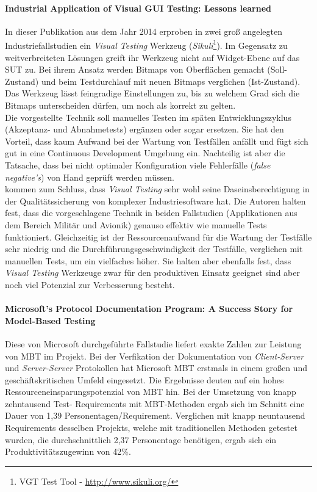 \paragraph{Industrial Application of Visual GUI Testing: Lessons learned \cite{alegroth_industrial_2014}}In dieser Publikation aus dem Jahr 2014 erproben \citeauthor{alegroth_industrial_2014} in zwei groß angelegten Industriefallstudien ein \textit{Visual Testing} Werkzeug (\textit{Sikuli}\footnote{VGT Test Tool - \url{http://www.sikuli.org/}}). Im Gegensatz zu weitverbreiteten Lösungen greift ihr Werkzeug nicht auf Widget-Ebene auf das \Gls{SUT} zu. Bei ihrem Ansatz werden Bitmaps von Oberflächen gemacht (Soll-Zustand) und beim Testdurchlauf mit neuen Bitmaps verglichen (Ist-Zustand). Das Werkzeug lässt feingradige Einstellungen zu, bis zu welchem Grad sich die Bitmaps unterscheiden dürfen, um noch als korrekt zu gelten.\\
Die vorgestellte Technik soll manuelles Testen im späten Entwicklungszyklus (Akzeptanz- und Abnahmetests) ergänzen oder sogar ersetzen. Sie hat den Vorteil, dass kaum Aufwand bei der Wartung von Testfällen anfällt und fügt sich gut in eine Continuous Development Umgebung ein. Nachteilig ist aber die Tatsache, dass bei nicht optimaler Konfiguration viele Fehlerfälle (\textit{false negative's}) von Hand geprüft werden müssen.\\
\citeauthor{alegroth_industrial_2014} kommen zum Schluss, dass \textit{Visual Testing} sehr wohl seine Daseinsberechtigung in der Qualitätssicherung von komplexer Industriesoftware hat. Die Autoren halten fest, dass die vorgeschlagene Technik in beiden Fallstudien (Applikationen aus dem Bereich Militär und Avionik) genauso effektiv wie manuelle Tests funktioniert. Gleichzeitig ist der Ressourcenaufwand für die Wartung der Testfälle sehr niedrig und die Durchführungsgeschwindigkeit der Testfälle, verglichen mit manuellen Tests, um ein vielfaches höher. Sie halten aber ebenfalls fest, dass \textit{Visual Testing} Werkzeuge zwar für den produktiven Einsatz geeignet sind aber noch viel Potenzial zur Verbesserung besteht.

\paragraph{Microsoft’s Protocol Documentation Program: A Success Story for Model-Based Testing \cite{grieskamp_microsofts_2010}}\label{sec:microsoft_fallstudie}
Diese von Microsoft durchgeführte Fallstudie liefert exakte Zahlen zur Leistung von \Gls{MBT} im Projekt. Bei der Verfikation der Dokumentation von \textit{Client-Server} und \textit{Server-Server} Protokollen hat Microsoft \Gls{MBT} erstmals in einem großen und geschäftskritischen Umfeld eingesetzt. Die Ergebnisse deuten auf ein hohes Ressourceneinsparungspotenzial von \Gls{MBT} hin. Bei der Umsetzung von knapp zehntausend Test- Requirements mit MBT-Methoden ergab sich im Schnitt eine Dauer von 1,39 Personentagen/Requirement. Verglichen mit knapp neuntausend Requirements desselben Projekts, welche mit traditionellen Methoden getestet wurden, die durchschnittlich 2,37 Personentage benötigen, ergab sich ein Produktivitätszugewinn von 42\%.

